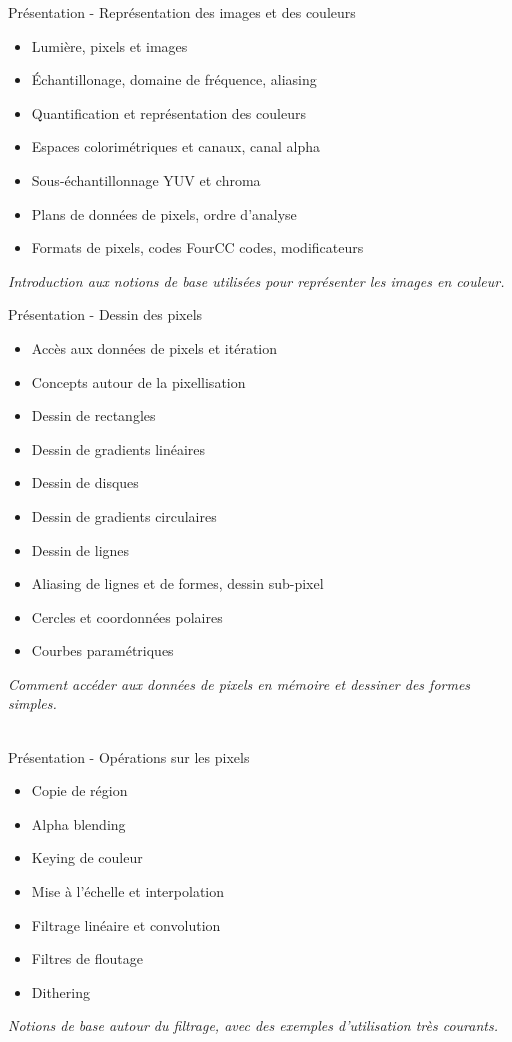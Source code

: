 \documentclass[a4paper,12pt,obeyspaces,spaces,hyphens]{article}
\begin{document}
\feagendatwocolumn
{Présentation - Représentation des images et des couleurs}
{
  \begin{itemize}
  \item Lumière, pixels et images
  \item Échantillonage, domaine de fréquence, aliasing
  \item Quantification et représentation des couleurs
  \item Espaces colorimétriques et canaux, canal alpha
  \item Sous-échantillonnage YUV et chroma
  \item Plans de données de pixels, ordre d'analyse
  \item Formats de pixels, codes FourCC codes, modificateurs
  \end{itemize}
  \vspace{0.5em}
  {\em Introduction aux notions de base utilisées pour représenter les images en couleur.}
}
{Présentation - Dessin des pixels}
{
  \begin{itemize}
  \item Accès aux données de pixels et itération
  \item Concepts autour de la pixellisation
  \item Dessin de rectangles
  \item Dessin de gradients linéaires
  \item Dessin de disques
  \item Dessin de gradients circulaires
  \item Dessin de lignes
  \item Aliasing de lignes et de formes, dessin sub-pixel
  \item Cercles et coordonnées polaires
  \item Courbes paramétriques
  \end{itemize}
  \vspace{0.5em}
  {\em Comment accéder aux données de pixels en mémoire et dessiner des formes simples.}
}
\\
\feagendatwocolumn
{Présentation - Opérations sur les pixels}
{
  \begin{itemize}
  \item Copie de région
  \item Alpha blending
  \item Keying de couleur
  \item Mise à l'échelle et interpolation
  \item Filtrage linéaire et convolution
  \item Filtres de floutage
  \item Dithering
  \end{itemize}
  \vspace{0.5em}
  {\em Notions de base autour du filtrage, avec des exemples d'utilisation très courants.}
}
\end{document}
